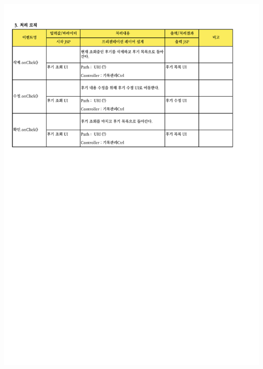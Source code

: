 {{{{{{{{{{{{{{{{{{{{{{{{{{{{{\includegraphics[width=20cm]{./Figure/Analysis/Display/review/review_04.pdf} \\
}}}}}}}}}}}}}}}}}}}}}}}}}}}}}
